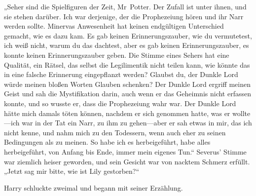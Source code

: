 „Seher sind die Spielfiguren der Zeit, Mr~Potter. Der Zufall ist unter ihnen, und sie stehen darüber. Ich war derjenige, der die Prophezeiung hören und ihr Narr werden sollte. Minervas Anwesenheit hat keinen endgültigen Unterschied gemacht, wie es dazu kam. Es gab keinen Erinnerungszauber, wie du vermutetest, ich weiß nicht, warum du das dachtest, aber es gab keinen Erinnerungszauber, es konnte keinen Erinnerungszauber geben. Die Stimme eines Sehers hat eine Qualität, ein Rätsel, das selbst die Legilimentik nicht teilen kann, wie könnte das in eine falsche Erinnerung eingepflanzt werden? Glaubst du, der Dunkle Lord würde meinen bloßen Worten Glauben schenken? Der Dunkle Lord ergriff meinen Geist und sah die Mystifikation darin, auch wenn er das Geheimnis nicht erfassen konnte, und so wusste er, dass die Prophezeiung wahr war. Der Dunkle Lord hätte mich damals töten können, nachdem er sich genommen hatte, was er wollte—ich war in der Tat ein Narr, zu ihm zu gehen—aber er sah etwas in mir, das ich nicht kenne, und nahm mich zu den Todessern, wenn auch eher zu seinen Bedingungen als zu meinen. So habe ich es herbeigeführt, habe alles herbeigeführt, von Anfang bis Ende, immer mein eigenes Tun.“
Severus' Stimme war ziemlich heiser geworden, und sein Gesicht war von nacktem Schmerz erfüllt.
„Jetzt sag mir bitte, wie ist Lily gestorben?“

Harry schluckte zweimal und begann mit seiner Erzählung.


